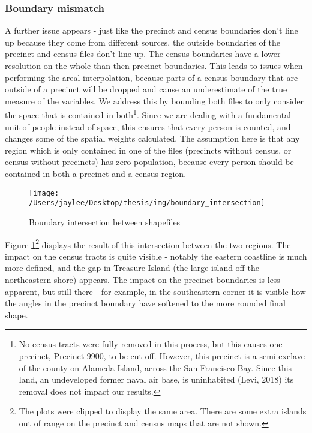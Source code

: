 \documentclass[12pt,twoside]{reedthesis}
\begin{document}
\hypertarget{boundary-mismatch}{%
\subsubsection{Boundary mismatch}\label{boundary-mismatch}}

A further issue appears - just like the precinct and census boundaries don't line up because they come from different sources, the outside boundaries of the precinct and census files don't line up. The census boundaries have a lower resolution on the whole than then precinct boundaries. This leads to issues when performing the areal interpolation, because parts of a census boundary that are outside of a precinct will be dropped and cause an underestimate of the true measure of the variables. We address this by bounding both files to only consider the space that is contained in both\footnote{No census tracts were fully removed in this process, but this causes one precinct, Precinct 9900, to be cut off. However, this precinct is a semi-exclave of the county on Alameda Island, across the San Francisco Bay. Since this land, an undeveloped former naval air base, is uninhabited (Levi, 2018) its removal does not impact our results.}. Since we are dealing with a fundamental unit of people instead of space, this ensures that every person is counted, and changes some of the spatial weights calculated. The assumption here is that any region which is only contained in one of the files (precincts without census, or census without precincts) has zero population, because every person should be contained in both a precinct and a census region.
\begin{figure}
\texttt{[image: /Users/jaylee/Desktop/thesis/img/boundary\_intersection]} \caption{Boundary intersection between shapefiles}\label{fig:boundary-intersect}
\end{figure}
Figure \ref{fig:boundary-intersect}\footnote{The plots were clipped to display the same area. There are some extra islands out of range on the precinct and census maps that are not shown.} displays the result of this intersection between the two regions. The impact on the census tracts is quite visible - notably the eastern coastline is much more defined, and the gap in Treasure Island (the large island off the northeastern shore) appears. The impact on the precinct boundaries is less apparent, but still there - for example, in the southeastern corner it is visible how the angles in the precinct boundary have softened to the more rounded final shape.
\end{document}
